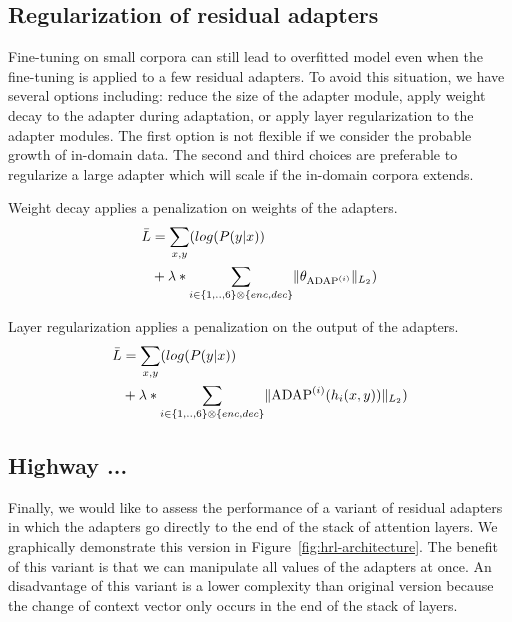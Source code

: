 \documentclass[11pt,a4paper]{article}
\newcommand{\fyTodo}[1]{\Todo[FY:]{\textcolor{orange}{#1}}}
\begin{document}
\subsection{Regularization of residual adapters \label{ssec:reg}}
Fine-tuning on small corpora can still lead to overfitted model even when the fine-tuning is applied to a few residual adapters. To avoid this situation, we have several options including: reduce the size of the adapter module, apply weight decay to the adapter during adaptation, or apply layer regularization to the adapter modules. The first option is not flexible \fyTodo{compatible ???} if we consider the probable growth of in-domain data. The second and third choices are preferable to regularize a large adapter which will scale if the in-domain corpora extends.\fyTodo{Style}

Weight decay applies a penalization on weights of the adapters.
\begin{equation}
  \begin{split}
    \bar{L} & = \mathop{\sum}_{x,y} (log(P(y|x)) \\
    & + \lambda * \sum_{i \in \{1,..,6\} \otimes \{enc, dec\}} \normL{\theta_{\operatorname{ADAP}^{(i)}}})
  \end{split}
\end{equation}

Layer regularization applies a penalization on the output of the adapters.
\begin{equation}
  \begin{split}
    \bar{L} & = \mathop{\sum}_{x,y} (log(P(y|x)) \\
    & + \lambda * \sum_{i \in \{1,..,6\} \otimes \{enc, dec\}} \normL{\operatorname{ADAP}^{(i)}(h_i(x,y))})
  \end{split}
\end{equation}

\subsection{Highway ...}
Finally, we would like to assess the performance of a variant of residual adapters in which the adapters go directly to the end of the stack of attention layers. We graphically demonstrate this version in Figure~\ref{fig:hrl-architecture}. The benefit of this variant is that we can manipulate all values of the adapters at once. An disadvantage of this variant is a lower complexity\fyTodo{Capicity ?? justify this ?} than original version because the change of context vector only occurs in the end of the stack of layers.
\end{document}
